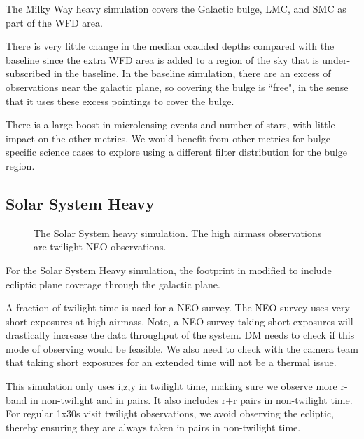 The Milky Way heavy simulation covers the Galactic bulge, LMC, and SMC as part of the WFD area.  

There is very little change in the median coadded depths compared with the baseline since the extra WFD area is added to a region of the sky that is under-subscribed in the baseline.  In the baseline simulation, there are an excess of observations near the galactic plane, so covering the bulge is ``free", in the sense that it uses these excess pointings to cover the bulge. 

There is a large boost in microlensing events and number of stars, with little impact on the other metrics. We would benefit from other metrics for bulge-specific science cases to explore using a different filter distribution for the bulge region.


\subsection{Solar System Heavy}
\begin{figure}
\caption{The Solar System heavy simulation. The high airmass observations are twilight NEO observations.}\label{fig:ssheavy}
\end{figure}

For the Solar System Heavy simulation, the footprint in modified to include ecliptic plane coverage through the galactic plane.

A fraction of twilight time is used for a NEO survey. The NEO survey uses very short exposures at high airmass. Note, a NEO survey taking short exposures will drastically increase the data throughput of the system. DM needs to check if this mode of observing would be feasible.  We also need to check with the camera team that taking short exposures for an extended time will not be a thermal issue.

This simulation only uses i,z,y in twilight time, making sure we observe more r-band in non-twilight and in pairs. It also includes r+r pairs in non-twilight time.  For regular 1x30s visit twilight observations, we avoid observing the ecliptic, thereby ensuring they are always taken in pairs in non-twilight time.

